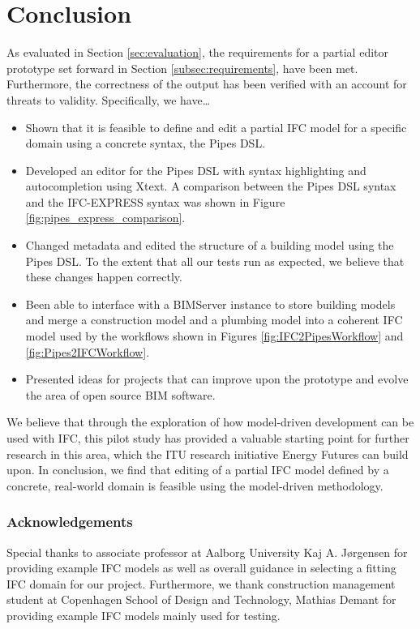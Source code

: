 \section{Conclusion}
\label{sec:conclusion}
As evaluated in Section \ref{sec:evaluation}, the requirements for a partial editor prototype set forward in Section \ref{subsec:requirements}, have been met. Furthermore, the correctness of the output has been verified with an account for threats to validity. Specifically, we have\ldots

\begin{itemize}
\item Shown that it is feasible to define and edit a partial IFC model for a specific domain using a concrete syntax, the Pipes DSL.
\item Developed an editor for the Pipes DSL with syntax highlighting and autocompletion using Xtext. A comparison between the Pipes DSL syntax and the IFC-EXPRESS syntax was shown in Figure \ref{fig:pipes_express_comparison}.
\item Changed metadata and edited the structure of a building model using the Pipes DSL. To the extent that all our tests run as expected, we believe that these changes happen correctly.
\item Been able to interface with a BIMServer instance to store building models and merge a construction model and a plumbing model into a coherent IFC model used by the workflows shown in Figures \ref{fig:IFC2PipesWorkflow} and \ref{fig:Pipes2IFCWorkflow}.
\item Presented ideas for projects that can improve upon the prototype and evolve the area of open source BIM software.
\end{itemize}

We believe that through the exploration of how model-driven development can be used with IFC, this pilot study has provided a valuable starting point for further research in this area, which the ITU research initiative Energy Futures can build upon. In conclusion, we find that editing of a partial IFC model defined by a concrete, real-world domain is feasible using the model-driven methodology.

\subsubsection{Acknowledgements} Special thanks to associate professor at Aalborg University Kaj A. Jørgensen for providing example IFC models as well as overall guidance in selecting a fitting IFC domain for our project. Furthermore, we thank construction management student at Copenhagen School of Design and Technology, Mathias Demant for providing example IFC models mainly used for testing.